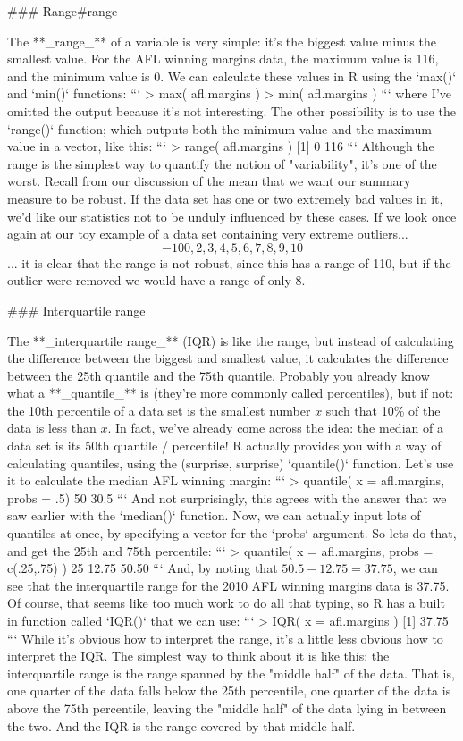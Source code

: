 ### Range{#range}

The **_range_** of a variable is very simple: it's the biggest value minus the smallest value. For the AFL winning margins data, the maximum value is 116, and the minimum value is 0. We can calculate these values in R using the `max()` and `min()` functions:
```
> max( afl.margins )
> min( afl.margins )
```
where I've omitted the output because it's not interesting. The other possibility is to use the `range()` function; which outputs both the minimum value and the maximum value in a vector, like this:
```
> range( afl.margins )
[1]   0 116
```
Although the range is the simplest way to quantify the notion of "variability", it's one of the worst. Recall from our discussion of the mean that we want our summary measure to be robust. If the data set has one or two extremely bad values in it, we'd like our statistics not to be unduly influenced by these cases. If we look once again at our toy example of a data set containing very extreme outliers...
$$
-100,2,3,4,5,6,7,8,9,10
$$
... it is clear that the range is not robust, since this has a range of 110, but if the outlier were removed we would have a range of only 8.

### Interquartile range

The **_interquartile range_** (IQR) is like the range, but instead of calculating the difference between the biggest and smallest value, it calculates the difference between the 25th quantile and the 75th quantile. Probably you already know what a **_quantile_** is (they're more commonly called percentiles), but if not: the 10th percentile of a data set is the smallest number $x$ such that 10\% of the data is less than $x$. In fact, we've already come across the idea: the median of a data set is its 50th quantile / percentile! R actually provides you with a way of calculating quantiles, using the (surprise, surprise) `quantile()` function. Let's use it to calculate the median AFL winning margin:
```
> quantile( x = afl.margins, probs = .5)
 50%
30.5 
```
And not surprisingly, this agrees with the answer that we saw earlier with the `median()` function. Now, we can actually input lots of quantiles at once, by specifying a vector for the `probs` argument. So lets do that, and get the 25th and 75th percentile:
```
> quantile( x = afl.margins, probs = c(.25,.75) )
  25%
12.75 50.50 
```
And, by noting that $50.5 - 12.75 = 37.75$, we can see that the interquartile range for the 2010 AFL winning margins data is 37.75. Of course, that seems like too much work to do all that typing, so R has a built in function called `IQR()` that we can use:
```
> IQR( x = afl.margins )
[1] 37.75
```
While it's obvious how to interpret the range, it's a little less obvious how to interpret the IQR. The simplest way to think about it is like this: the interquartile range is the range spanned by the "middle half" of the data. That is, one quarter of the data falls below the 25th percentile, one quarter of the data is above the 75th percentile, leaving the "middle half" of the data lying in between the two. And the IQR is the range covered by that middle half.


